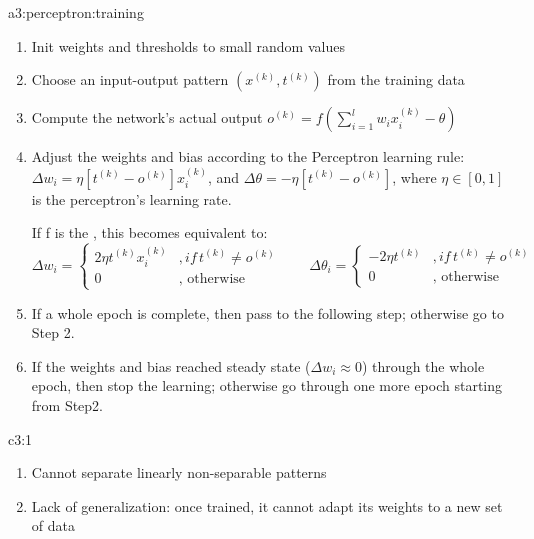 \documentclass{tron}
\begin{document}
\begin{algo}{a3:perceptron:training}
	\begin{enumerate}
		\item Init weights and thresholds to small random values
		\item Choose an input-output pattern $(x^{(k)}, t^{(k)})$ from the training data
		\item Compute the network's actual output $o^{(k)} = f\left(\sum_{i=1}^{l} w_i x_i^{(k)} - \theta \right)$
		\item Adjust the weights and bias according to the Perceptron learning rule:\\
				$\Delta w_i = \eta [t^{(k)} - o^{(k)}] x_i^{(k)}$, and $\Delta \theta = - \eta [t^{(k)} - o^{(k)}]$, where $\eta \in [0,1]$ is the perceptron's learning rate.
			
				If  f is the , this becomes equivalent to:
				\begin{equation}
					\Delta w_i = \begin{cases} 2\eta t^{(k)} x_i^{(k)} &, if \, t^{(k)} \neq o^{(k)} \\ 0 & \text{, otherwise}\end{cases} \qquad 
					\Delta \theta_i = \begin{cases} -2\eta t^{(k)} &, if \, t^{(k)} \neq o^{(k)} \\ 0 & \text{, otherwise}\end{cases} 
				\end{equation}
		\item If a whole epoch is complete, then pass to the following step; otherwise go to Step 2.
		\item If the weights and bias reached steady state ($\Delta w_i \approx 0$) through the whole epoch, then stop the learning; otherwise go through one more epoch starting from Step2.
	\end{enumerate}
\end{algo}

\begin{cons}[Perceptron]{c3:1}
	\begin{enumerate}
		\item Cannot separate linearly non-separable patterns
		\item Lack of generalization: once trained, it cannot adapt its weights to a new set of data
	\end{enumerate}
\end{cons}
\end{document}
